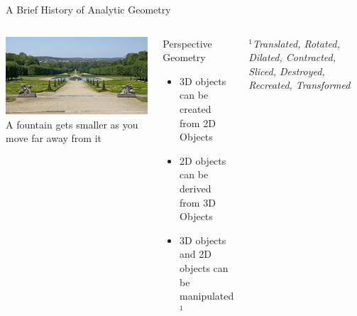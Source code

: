\documentclass[14pt,aspectratio=169]{beamer}
\begin{document}
\begin{frame}{A Brief History of Analytic Geometry}
 \begin{columns}

    \centering
        \includegraphics[width=1\textwidth]{image02.jpg} \\
        A fountain gets smaller as you move far away from it
    \begin{block}{Perspective Geometry}
        \vspace{1mm}
        \begin{itemize}
         \item 3D objects can be created from 2D Objects
         \item 2D objects can be derived from 3D Objects
         \item 3D objects and 2D objects can be manipulated${}^\text{1}$


        \end{itemize}
        \vspace{1mm}

    \end{block}
    {\footnotesize ${}^\text{1}$\textit{Translated, Rotated, Dilated, Contracted, Sliced, Destroyed, Recreated, Transformed}}

 \end{columns}

\end{frame}
\end{document}
